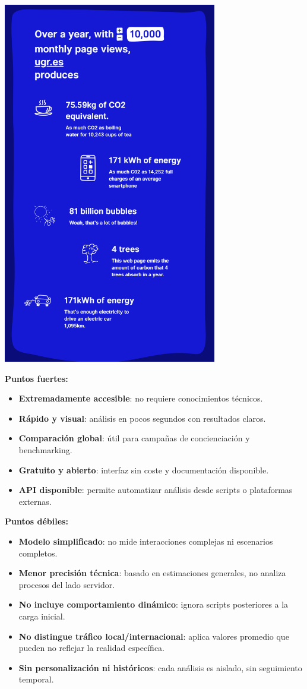 \documentclass[12pt,a4paper]{report}
\begin{document}
\begin{center}
  \includegraphics[width=0.7\textwidth]{imagenes/WCC_3.png}
\end{center}

\textbf{Puntos fuertes:}
\begin{itemize}
  \item \textbf{Extremadamente accesible}: no requiere conocimientos técnicos.
  \item \textbf{Rápido y visual}: análisis en pocos segundos con resultados claros.
  \item \textbf{Comparación global}: útil para campañas de concienciación y benchmarking.
  \item \textbf{Gratuito y abierto}: interfaz sin coste y documentación disponible.
  \item \textbf{API disponible}: permite automatizar análisis desde scripts o plataformas externas.
\end{itemize}

\textbf{Puntos débiles:}
\begin{itemize}
  \item \textbf{Modelo simplificado}: no mide interacciones complejas ni escenarios completos.
  \item \textbf{Menor precisión técnica}: basado en estimaciones generales, no analiza procesos del lado servidor.
  \item \textbf{No incluye comportamiento dinámico}: ignora scripts posteriores a la carga inicial.
  \item \textbf{No distingue tráfico local/internacional}: aplica valores promedio que pueden no reflejar la realidad específica.
  \item \textbf{Sin personalización ni históricos}: cada análisis es aislado, sin seguimiento temporal.
\end{itemize}
\end{document}
